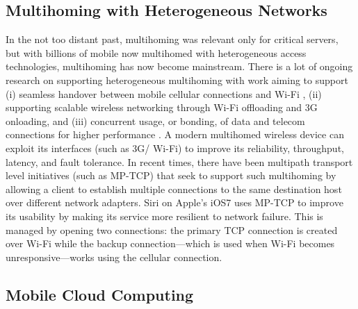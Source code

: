\documentclass{sigcomm-alternate}
\begin{document}
\subsection{Multihoming with Heterogeneous Networks}

In the not too distant past, multihoming was relevant only for critical servers, but with billions of mobile now multihomed with heterogeneous access technologies, multihoming has now become mainstream. There is a lot of ongoing research on supporting heterogeneous multihoming with work aiming to support (i) seamless handover between mobile cellular connections and Wi-Fi \cite{paasch2012exploring}, (ii) supporting scalable wireless networking through Wi-Fi offloading and 3G onloading, and (iii) concurrent usage, or bonding, of data and telecom connections for higher performance \cite{deng2014wifi}. A modern multihomed wireless device can exploit its interfaces (such as 3G/ Wi-Fi) to improve its reliability, throughput, latency, and fault tolerance. In recent times, there have been multipath transport level initiatives (such as MP-TCP) that seek to support such multihoming by allowing a client to establish multiple connections to the same destination host over different network adapters. Siri on Apple's iOS7 uses MP-TCP to improve its usability by making its service more resilient to network failure. This is managed by opening two connections: the primary TCP connection is created over Wi-Fi while the backup connection---which is used when Wi-Fi becomes unresponsive---works using the cellular connection. 






\subsection{Mobile Cloud Computing}
\end{document}
